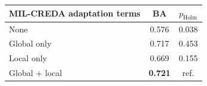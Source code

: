 \begin{tabular*}{\columnwidth}{@{\extracolsep{\fill}}lcc}
\toprule
MIL-CREDA adaptation terms & BA & $p_{\mathrm{Holm}}$ \\
\midrule
None & 0.576 & 0.038 \\
Global only & 0.717 & 0.453 \\
Local only & 0.669 & 0.155 \\
Global + local & \textbf{0.721} & ref. \\
\bottomrule
\end{tabular*}
